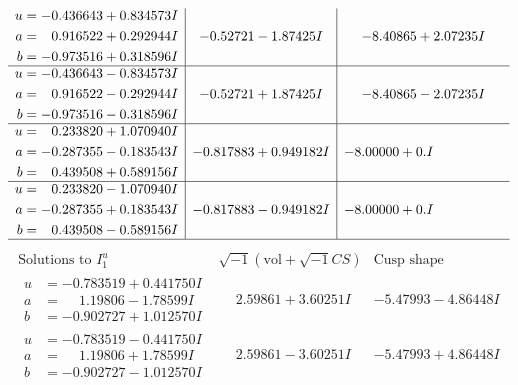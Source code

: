 \documentclass[1p]{elsarticle_modified}
\theoremstyle{definition}
\newcommand{\I}{\sqrt{-1}}
\begin{document}
$$\begin{array}{c|c|c}
\begin{aligned}
u &= -0.436643 + 0.834573 I \\
a &= \phantom{-}0.916522 + 0.292944 I \\
b &= -0.973516 + 0.318596 I\end{aligned}
 & -0.52721 - 1.87425 I & -8.40865 + 2.07235 I \\ \hline\begin{aligned}
u &= -0.436643 - 0.834573 I \\
a &= \phantom{-}0.916522 - 0.292944 I \\
b &= -0.973516 - 0.318596 I\end{aligned}
 & -0.52721 + 1.87425 I & -8.40865 - 2.07235 I \\ \hline\begin{aligned}
u &= \phantom{-}0.233820 + 1.070940 I \\
a &= -0.287355 - 0.183543 I \\
b &= \phantom{-}0.439508 + 0.589156 I\end{aligned}
 & -0.817883 + 0.949182 I & -8.00000 + 0. I\phantom{ +0.000000I} \\ \hline\begin{aligned}
u &= \phantom{-}0.233820 - 1.070940 I \\
a &= -0.287355 + 0.183543 I \\
b &= \phantom{-}0.439508 - 0.589156 I\end{aligned}
 & -0.817883 - 0.949182 I & -8.00000 + 0. I\phantom{ +0.000000I}\\
 \hline 
 \end{array}$$\newpage$$\begin{array}{c|c|c}  
\text{Solutions to }I^u_{1}& \I (\text{vol} + \sqrt{-1}CS) & \text{Cusp shape}\\
 \hline 
\begin{aligned}
u &= -0.783519 + 0.441750 I \\
a &= \phantom{-}1.19806 - 1.78599 I \\
b &= -0.902727 + 1.012570 I\end{aligned}
 & \phantom{-}2.59861 + 3.60251 I & -5.47993 - 4.86448 I \\ \hline\begin{aligned}
u &= -0.783519 - 0.441750 I \\
a &= \phantom{-}1.19806 + 1.78599 I \\
b &= -0.902727 - 1.012570 I\end{aligned}
 & \phantom{-}2.59861 - 3.60251 I & -5.47993 + 4.86448 I \\ \hline\begin{aligned}

\end{aligned}
\end{array}$$
\end{document}
